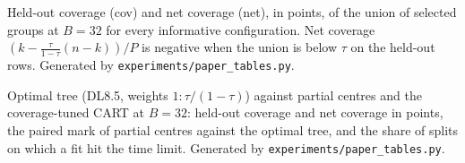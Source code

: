 \documentclass[11pt]{article}
\begin{document}
\begin{table}[p]\centering\scriptsize\setlength{\tabcolsep}{3pt}
\caption{Held-out coverage (cov) and net coverage (net), in points, of the union of selected groups at $B=32$ for every informative configuration. Net coverage $(k-\tfrac{\tau}{1-\tau}(n-k))/P$ is negative when the union is below $\tau$ on the held-out rows. Generated by \texttt{experiments/paper\_tables.py}.}\label{tab:net32}

\end{table}

\begin{table}[p]\centering\scriptsize\setlength{\tabcolsep}{3pt}
\caption{Optimal tree (DL8.5, weights $1:\tau/(1-\tau)$) against partial centres and the coverage-tuned CART at $B=32$: held-out coverage and net coverage in points, the paired mark of partial centres against the optimal tree, and the share of splits on which a fit hit the time limit. Generated by \texttt{experiments/paper\_tables.py}.}\label{tab:treeopt}

\end{table}



\end{document}
